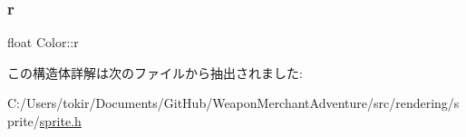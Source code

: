 \mbox{\label{struct_color_a3958a556b47d2de3dd45c75aac833c20}} 
\subsubsection{\texorpdfstring{r}{r}}
{\footnotesize\ttfamily float Color\+::r}



この構造体詳解は次のファイルから抽出されました\+:\begin{DoxyCompactItemize}
\item 
C\+:/\+Users/tokir/\+Documents/\+Git\+Hub/\+Weapon\+Merchant\+Adventure/src/rendering/sprite/\mbox{\hyperlink{sprite_8h}{sprite.\+h}}\end{DoxyCompactItemize}
